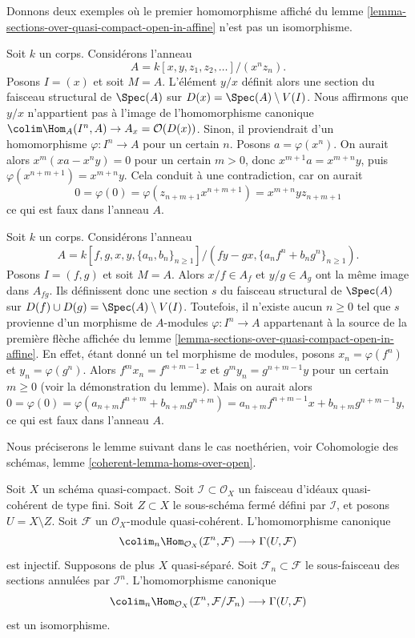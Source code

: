 \begin{example}
\label{example-does-not-work-in-general}
Donnons deux exemples où le premier homomorphisme affiché du
lemme \ref{lemma-sections-over-quasi-compact-open-in-affine}
n'est pas un isomorphisme.

\medskip\noindent
Soit $k$ un corps. Considérons l'anneau
$$
A = k[x, y, z_1, z_2, \ldots]/(x^nz_n).
$$
Posons $I = (x)$ et soit $M = A$. L'élément $y/x$ définit alors une
section du faisceau structural de $\Spec(A)$ sur $D(x) = \Spec(A) \setminus V(I)$.
Nous affirmons que $y/x$ n'appartient pas à l'image de l'homomorphisme canonique
$\colim \Hom_A(I^n, A) \to A_x = \mathcal{O}(D(x))$. Sinon, il
proviendrait d'un homomorphisme $\varphi : I^n \to A$ pour un certain $n$.
Posons $a = \varphi(x^n)$. On aurait alors $x^m(xa - x^ny) = 0$ pour un certain
$m > 0$, donc $x^{m + 1}a = x^{m + n}y$, puis
$\varphi(x^{n + m + 1}) = x^{m + n}y$. Cela conduit à une
contradiction, car on aurait
$$
0 = \varphi(0) = \varphi(z_{n + m + 1} x^{n + m + 1}) =
x^{m + n}y z_{n + m + 1}
$$
ce qui est faux dans l'anneau $A$.

\medskip\noindent
Soit $k$ un corps. Considérons l'anneau
$$
A = k[f, g, x, y, \{a_n, b_n\}_{n \geq 1}]/
(fy - gx, \{a_nf^n + b_ng^n\}_{n \geq 1}).
$$
Posons $I = (f, g)$ et soit $M = A$. Alors $x/f \in A_f$ et $y/g \in A_g$
ont la même image dans $A_{fg}$. Ils définissent donc une section $s$
du faisceau structural de $\Spec(A)$ sur
$D(f) \cup D(g) = \Spec(A) \setminus V(I)$. Toutefois, il n'existe aucun
$n \geq 0$ tel que $s$ provienne d'un morphisme de $A$-modules
$\varphi : I^n \to A$ appartenant à la source de la première flèche
affichée du lemme \ref{lemma-sections-over-quasi-compact-open-in-affine}.
En effet, étant donné un tel morphisme de modules, posons
$x_n = \varphi(f^n)$ et $y_n = \varphi(g^n)$.
Alors $f^mx_n = f^{n + m - 1}x$ et
$g^my_n = g^{n + m - 1}y$ pour un certain $m \geq 0$ (voir la
démonstration du lemme). Mais on aurait alors
$0 = \varphi(0) =
\varphi(a_{n + m}f^{n + m} + b_{n + m}g^{n + m}) =
a_{n + m}f^{n + m - 1}x + b_{n + m}g^{n + m - 1}y$, ce qui est faux
dans l'anneau $A$.
\end{example}

\noindent
Nous préciserons le lemme suivant dans le cas noethérien, voir
Cohomologie des schémas, lemme \ref{coherent-lemma-homs-over-open}.

\begin{lemma}
\label{lemma-sections-over-quasi-compact-open}
Soit $X$ un schéma quasi-compact.
Soit $\mathcal{I} \subset \mathcal{O}_X$ un
faisceau d'idéaux quasi-cohérent de type fini.
Soit $Z \subset X$ le sous-schéma fermé
défini par $\mathcal{I}$, et posons $U = X \setminus Z$.
Soit $\mathcal{F}$ un $\mathcal{O}_X$-module
quasi-cohérent. L'homomorphisme canonique
$$
\colim_n \Hom_{\mathcal{O}_X}(\mathcal{I}^n,
\mathcal{F})
\longrightarrow
\Gamma(U, \mathcal{F})
$$
est injectif. Supposons de plus $X$ quasi-séparé.
Soit $\mathcal{F}_n \subset \mathcal{F}$
le sous-faisceau des sections annulées par $\mathcal{I}^n$.
L'homomorphisme canonique
$$
\colim_n \Hom_{\mathcal{O}_X}(\mathcal{I}^n,
\mathcal{F}/\mathcal{F}_n)
\longrightarrow
\Gamma(U, \mathcal{F})
$$
est un isomorphisme.
\end{lemma}

